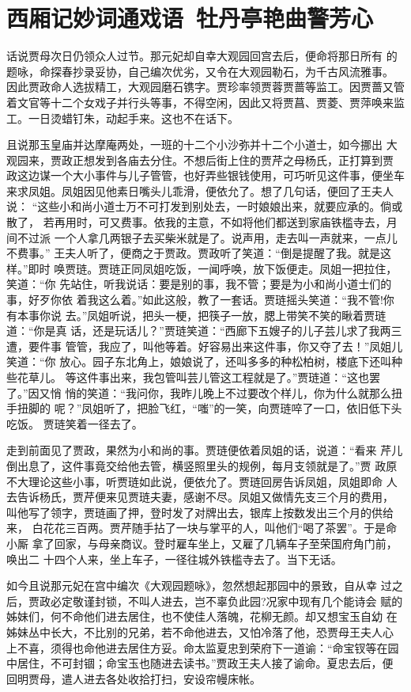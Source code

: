 \chapter{西厢记妙词通戏语~牡丹亭艳曲警芳心}

话说贾母次日仍领众人过节。那元妃却自幸大观园回宫去后，便命将那日所有
的题咏，命探春抄录妥协，自己编次优劣，又令在大观园勒石，为千古风流雅事。
因此贾政命人选拔精工，大观园磨石镌字。贾珍率领贾蓉贾蔷等监工。因贾蔷又管
着文官等十二个女戏子并行头等事，不得空闲，因此又将贾菖、贾菱、贾萍唤来监
工。一日烫蜡钉朱，动起手来。这也不在话下。

且说那玉皇庙并达摩庵两处，一班的十二个小沙弥并十二个小道士，如今挪出
大观园来，贾政正想发到各庙去分住。不想后街上住的贾芹之母杨氏，正打算到贾
政这边谋一个大小事件与儿子管管，也好弄些银钱使用，可巧听见这件事，便坐车
来求凤姐。凤姐因见他素日嘴头儿乖滑，便依允了。想了几句话，便回了王夫人说：
“这些小和尚小道士万不可打发到别处去，一时娘娘出来，就要应承的。倘或散了，
若再用时，可又费事。依我的主意，不如将他们都送到家庙铁槛寺去，月间不过派
一个人拿几两银子去买柴米就是了。说声用，走去叫一声就来，一点儿不费事。”
王夫人听了，便商之于贾政。贾政听了笑道：“倒是提醒了我。就是这样。”即时
唤贾琏。贾琏正同凤姐吃饭，一闻呼唤，放下饭便走。凤姐一把拉住，笑道：“你
先站住，听我说话：要是别的事，我不管；要是为小和尚小道士们的事，好歹你依
着我这么着。”如此这般，教了一套话。贾琏摇头笑道：“我不管!你有本事你说
去。”凤姐听说，把头一梗，把筷子一放，腮上带笑不笑的瞅着贾琏道：“你是真
话，还是玩话儿？”贾琏笑道：“西廊下五嫂子的儿子芸儿求了我两三遭，要件事
管管，我应了，叫他等着。好容易出来这件事，你又夺了去！”凤姐儿笑道：“你
放心。园子东北角上，娘娘说了，还叫多多的种松柏树，楼底下还叫种些花草儿。
等这件事出来，我包管叫芸儿管这工程就是了。”贾琏道：“这也罢了。”因又悄
悄的笑道：“我问你，我昨儿晚上不过要改个样儿，你为什么就那么扭手扭脚的
呢？”凤姐听了，把脸飞红，“嗤”的一笑，向贾琏啐了一口，依旧低下头吃饭。
贾琏笑着一径去了。

走到前面见了贾政，果然为小和尚的事。贾琏便依着凤姐的话，说道：“看来
芹儿倒出息了，这件事竟交给他去管，横竖照里头的规例，每月支领就是了。”贾
政原不大理论这些小事，听贾琏如此说，便依允了。贾琏回房告诉凤姐，凤姐即命
人去告诉杨氏，贾芹便来见贾琏夫妻，感谢不尽。凤姐又做情先支三个月的费用，
叫他写了领字，贾琏画了押，登时发了对牌出去，银库上按数发出三个月的供给来，
白花花三百两。贾芹随手拈了一块与掌平的人，叫他们“喝了茶罢”。于是命小厮
拿了回家，与母亲商议。登时雇车坐上，又雇了几辆车子至荣国府角门前，唤出二
十四个人来，坐上车子，一径往城外铁槛寺去了。当下无话。

如今且说那元妃在宫中编次《大观园题咏》，忽然想起那园中的景致，自从幸
过之后，贾政必定敬谨封锁，不叫人进去，岂不辜负此园?况家中现有几个能诗会
赋的姊妹们，何不命他们进去居住，也不使佳人落魄，花柳无颜。却又想宝玉自幼
在姊妹丛中长大，不比别的兄弟，若不命他进去，又怕冷落了他，恐贾母王夫人心
上不喜，须得也命他进去居住方妥。命太监夏忠到荣府下一道谕：“命宝钗等在园
中居住，不可封锢；命宝玉也随进去读书。”贾政王夫人接了谕命。夏忠去后，便
回明贾母，遣人进去各处收拾打扫，安设帘幔床帐。


